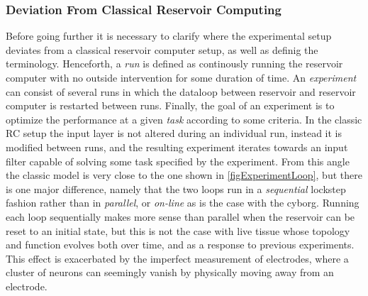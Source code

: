 \subsubsection{Deviation From Classical Reservoir Computing}
Before going further it is necessary to clarify where the experimental setup
deviates from a classical reservoir computer setup, as well as definig the
terminology.
Henceforth, a \emph{run} is defined as continously running the reservoir
computer with no outside intervention for some duration of time.
An \emph{experiment} can consist of several runs in which the dataloop between
reservoir and reservoir computer is restarted between runs. 
Finally, the goal of an experiment is to optimize the performance at a given
\emph{task} according to some criteria.
In the classic RC setup the input layer is not altered during an individual run,
instead it is modified between runs, and the resulting experiment iterates
towards an input filter capable of solving some task specified by the
experiment.
From this angle the classic model is very close to the one shown in
\ref{figExperimentLoop}, but there is one major difference, namely that the two
loops run in a \emph{sequential} lockstep fashion 
rather than in \emph{parallel}, or \emph{on-line} as is the case with the cyborg.
Running each loop sequentially makes more sense than parallel when the reservoir
can be reset to an initial state, but this is not 
the case with live tissue whose topology and function evolves both over time,
and as a response to previous experiments. This effect is exacerbated by the
imperfect measurement of electrodes, where a cluster of neurons can seemingly
vanish by physically moving away from an electrode.
